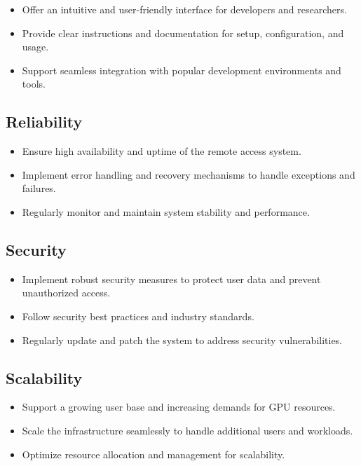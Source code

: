 \begin{itemize}
    \item Offer an intuitive and user-friendly interface for developers and researchers.
    \item Provide clear instructions and documentation for setup, configuration, and usage.
    \item Support seamless integration with popular development environments and tools.
\end{itemize}


\subsection{Reliability}

\begin{itemize}
    \item Ensure high availability and uptime of the remote access system.
    \item Implement error handling and recovery mechanisms to handle exceptions and failures.
    \item Regularly monitor and maintain system stability and performance.
\end{itemize}


\subsection{Security}

\begin{itemize}
    \item Implement robust security measures to protect user data and prevent unauthorized access.
    \item Follow security best practices and industry standards.
    \item Regularly update and patch the system to address security vulnerabilities.
\end{itemize}


\subsection{Scalability}

\begin{itemize}
    \item Support a growing user base and increasing demands for GPU resources.
    \item Scale the infrastructure seamlessly to handle additional users and workloads.
    \item Optimize resource allocation and management for scalability.
\end{itemize}

